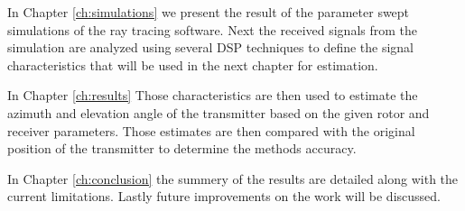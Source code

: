 In Chapter \ref{ch:simulations} we present the result of the parameter swept simulations of the ray tracing software. Next the received signals from the simulation are analyzed using several DSP techniques to define the signal characteristics that will be used in the next chapter for estimation. 

In Chapter  \ref{ch:results} Those characteristics are then used to estimate the azimuth and elevation angle of the transmitter based on the given rotor and receiver parameters. Those estimates are then compared with the original position of the transmitter to determine the methods accuracy.

In Chapter \ref{ch:conclusion} the summery of the results are detailed along with the current limitations. Lastly future improvements on the work will be discussed.